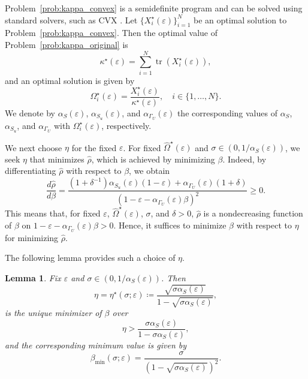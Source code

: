 \documentclass[letterpaper,10pt,conference]{ieeeconf}
\newtheorem{lemma}{Lemma}
\DeclareMathOperator{\tr}{tr}
\begin{document}
Problem~\eqref{prob:kappa_convex} is a semidefinite program and can be solved using standard solvers, such as CVX \cite{grant2014cvx}.
Let $\{X_i^\star(\varepsilon)\}_{i=1}^N$ be an optimal solution to Problem~\eqref{prob:kappa_convex}.
Then the optimal value of Problem~\eqref{prob:kappa_original} is
\begin{equation}
  \kappa^\star(\varepsilon) = \sum_{i=1}^N \tr(X_i^\star(\varepsilon)),
\end{equation}
and an optimal solution is given by
\begin{equation} \label{eq:Omega_i_star}
  \Omega_i^\star(\varepsilon) = \frac{X_i^\star(\varepsilon)}{\kappa^\star(\varepsilon)},
  \quad
  i \in \{1,\ldots,N\}.
\end{equation}
We denote by $\alpha_S(\varepsilon)$, $\alpha_{S_u}(\varepsilon)$, and $\alpha_{\Gamma_U}(\varepsilon)$ the corresponding values of $\alpha_S$, $\alpha_{S_u}$, and $\alpha_{\Gamma_U}$ with $\Omega_i^\star(\varepsilon)$, respectively.

We next choose $\eta$ for the fixed $\varepsilon$.
For fixed $\hat\Omega^\star(\varepsilon)$ and $\sigma \in (0,1/\alpha_S(\varepsilon))$, we seek $\eta$ that minimizes $\hat{\rho}$, which is achieved by minimizing $\beta$.
Indeed, by differentiating $\hat{\rho}$ with respect to $\beta$, we obtain
\begin{equation}
  \frac{d\hat{\rho}}{d\beta}
  =
  \frac{
    (1+\delta^{-1})\alpha_{S_u}(\varepsilon)(1-\varepsilon)
    +
    \alpha_{\Gamma_U}(\varepsilon)(1+\delta)
  }{
    \left(
      1-\varepsilon-\alpha_{\Gamma_U}(\varepsilon)\beta
    \right)^2
  }
  \geq 0.
\end{equation}
This means that, for fixed $\varepsilon$, $\hat{\Omega}^\star(\varepsilon)$, $\sigma$, and $\delta>0$, $\hat{\rho}$ is a nondecreasing function of $\beta$ on $1-\varepsilon-\alpha_{\Gamma_U}(\varepsilon)\beta > 0$.
Hence, it suffices to minimize $\beta$ with respect to $\eta$ for minimizing $\hat{\rho}$.

The following lemma provides such a choice of $\eta$.

\begin{lemma} \label{lem:choise_eta}
  Fix $\varepsilon$ and $\sigma \in (0,1/\alpha_S(\varepsilon))$.
  Then
  \begin{equation} \label{eq:eta_star}
    \eta = \eta^\star(\sigma; \varepsilon) \coloneqq \frac{\sqrt{\sigma\alpha_S(\varepsilon)}}{1-\sqrt{\sigma\alpha_S(\varepsilon)}},
  \end{equation}
  is the unique minimizer of $\beta$ over
  \begin{equation} \label{eq:admissible_eta}
    \eta > \frac{\sigma\alpha_S(\varepsilon)}{1-\sigma\alpha_S(\varepsilon)},
  \end{equation}
  and the corresponding minimum value is given by
  \begin{equation} \label{eq:beta_min}
    \beta_{\min}(\sigma; \varepsilon) = \frac{\sigma}{\left(1-\sqrt{\sigma\alpha_S(\varepsilon)}\right)^2}.
  \end{equation}
\end{lemma}
\end{document}
